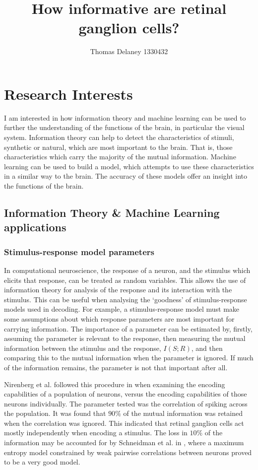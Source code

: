 \documentclass[a4paper,12pt]{article}
\title{How informative are retinal ganglion cells?}
\author{Thomas Delaney 1330432}
\theoremstyle{definition}
\begin{document}
 \thispagestyle{plain}
 \onehalfspacing
 \section*{Research Interests}
 I am interested in how information theory and machine learning can be used to further the understanding of the functions of the brain, in particular the visual system. Information  theory can help to detect the characteristics of stimuli, synthetic or natural, which are most important to the brain. That is, those characteristics which carry the majority of the mutual information. Machine learning can be used to build a model, which attempts to use these characteristics in a similar way to the brain. The accuracy of these models offer an insight into the functions of the brain.

\subsection*{Information Theory \& Machine Learning applications}
\subsubsection*{Stimulus-response model parameters}
 In computational neuroscience, the response of a neuron, and the stimulus which elicits that response, can be treated as random variables. This allows the use of information theory for analysis of the response and its interaction with the stimulus. This can be useful when analysing the `goodness' of stimulus-response models used in decoding. For example, a stimulus-response model must make some assumptions about which response parameters are most important for carrying information. The importance of a parameter can be estimated by, firstly, assuming the parameter is relevant to the response, then measuring the mutual information between the stimulus and the response, $I(S; R)$, and then comparing this to the mutual information when the parameter is ignored. If much of the information remains, the parameter is not that important after all.

 Nirenberg et al. followed this procedure in \cite{retinal} when examining the encoding capabilities of a population of neurons, versus the encoding capabilities of those neurons individually. The parameter tested was the correlation of spiking across the population. It was found that $90\%$ of the mutual information was retained when the correlation was ignored. This indicated that retinal ganglion cells act mostly independently when encoding a stimulus. The loss in $10\%$ of the information may be accounted for by Schneidman et al. in \cite{weak}, where a maximum entropy model constrained by weak pairwise correlations between neurons proved to be a very good model.
\end{document}
